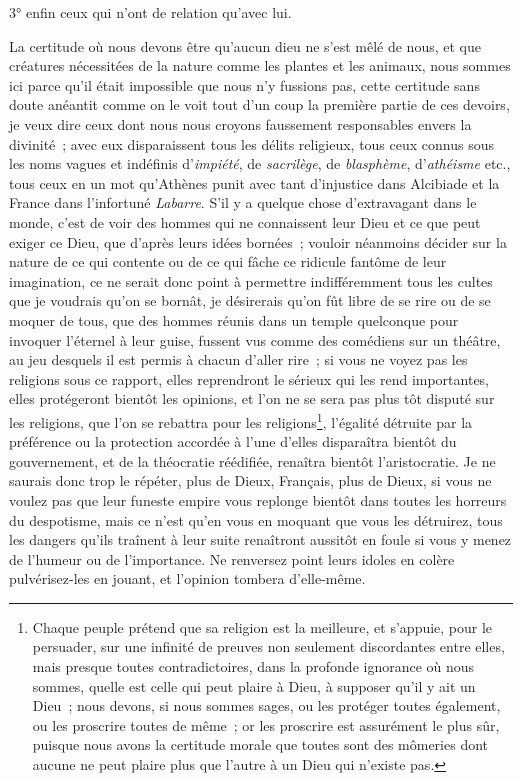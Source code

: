 \documentclass[french,twoside]{book} %
\begin{document}
3° enfin ceux qui n’ont de relation qu’avec lui.\par
La certitude où nous devons être qu’aucun dieu ne s’est mêlé de nous, et que créatures nécessitées de la nature comme les plantes et les animaux, nous sommes ici parce qu’il était impossible que nous n’y fussions pas, cette certitude sans doute anéantit comme on le voit tout d’un coup la première partie de ces devoirs, je veux dire ceux dont nous nous croyons faussement responsables envers la divinité ; avec eux disparaissent tous les délits religieux, tous ceux connus sous les noms vagues et indéfinis d’{\itshape impiété}, de {\itshape sacrilège}, de {\itshape blasphème}, d’{\itshape athéisme} etc., tous ceux en un mot qu’Athènes punit avec tant d’injustice dans Alcibiade et la France dans l’infortuné {\itshape Labarre}. S’il y a quelque chose d’extravagant dans le monde, c’est de voir des hommes qui ne connaissent leur Dieu et ce que peut exiger ce Dieu, que d’après leurs idées bornées ; vouloir néanmoins décider sur la nature de ce qui contente ou de ce qui fâche ce ridicule fantôme de leur imagination, ce ne serait donc point à permettre indifféremment tous les cultes que je voudrais qu’on se bornât, je désirerais qu’on fût libre de se rire ou de se moquer de tous, que des hommes réunis dans un temple quelconque pour invoquer l’éternel à leur guise, fussent vus comme des comédiens sur un théâtre, au jeu desquels il est permis à chacun d’aller rire ; si vous ne voyez pas les religions sous ce rapport, elles reprendront le sérieux qui les rend importantes, elles protégeront bientôt les opinions, et l’on ne se sera pas plus tôt disputé sur les religions, que l’on se rebattra pour les religions\footnote{ Chaque peuple prétend que sa religion est la meilleure, et s’appuie, pour le persuader, sur une infinité de preuves non seulement discordantes entre elles, mais presque toutes contradictoires, dans la profonde ignorance où nous sommes, quelle est celle qui peut plaire à Dieu, à supposer qu’il y ait un Dieu ; nous devons, si nous sommes sages, ou les protéger toutes également, ou les proscrire toutes de même ; or les proscrire est assurément le plus sûr, puisque nous avons la certitude morale que toutes sont des mômeries dont aucune ne peut plaire plus que l’autre à un Dieu qui n’existe pas.}, l’égalité détruite par la préférence ou la protection accordée à l’une d’elles disparaîtra bientôt du gouvernement, et de la théocratie réédifiée, renaîtra bientôt l’aristocratie. Je ne saurais donc trop le répéter, plus de Dieux, Français, plus de Dieux, si vous ne voulez pas que leur funeste empire vous replonge bientôt dans toutes les horreurs du despotisme, mais ce n’est qu’en vous en moquant que vous les détruirez, tous les dangers qu’ils traînent à leur suite renaîtront aussitôt en foule si vous y menez de l’humeur ou de l’importance. Ne renversez point leurs idoles en colère pulvérisez-les en jouant, et l’opinion tombera d’elle-même.\par
\end{document}
